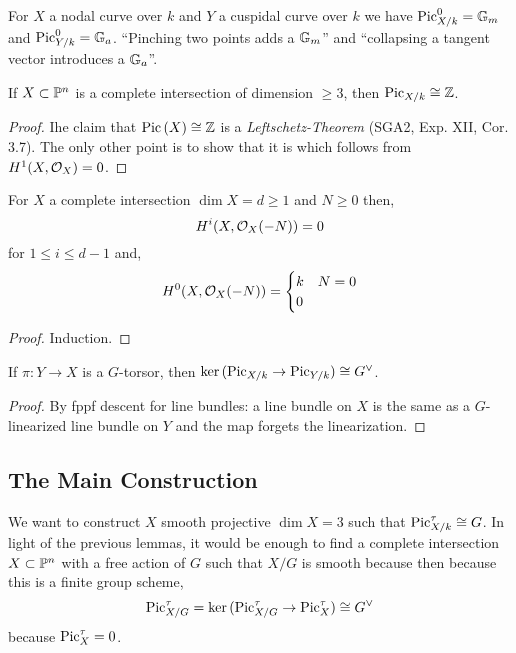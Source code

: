 \documentclass[12pt]{article}
\begin{document}
\begin{example}
For $X$ a nodal curve over $k$ and $Y$ a cuspidal curve over $k$ we have $\mathrm{Pic}^0_{X/k} = \Gm$ and $\mathrm{Pic}^0_{Y/k} = \Ga$. ``Pinching two points adds a $\Gm$'' and ``collapsing a tangent vector introduces a $\Ga$''. 
\end{example}

\begin{lemma}
If $X \subset \P^n$ is a complete intersection of dimension $\ge 3$, then $\fPic_{X/k} \cong \Z$. 
\end{lemma}

\begin{proof}
Ihe claim that $\Pic{X} \cong \Z$ is a \textit{Leftschetz-Theorem} (SGA2, Exp. XII, Cor. 3.7). The only other point is to show that it is \etale which follows from $H^1(X, \struct{X}) = 0$. 
\end{proof}

\begin{prop}
For $X$ a complete intersection $\dim{X} = d \ge 1$ and $N \ge 0$ then,
\[ H^i(X, \struct{X}(-N)) = 0 \]
for $1 \le i \le d - 1$ and,
\[ H^0(X, \struct{X}(-N)) = 
\begin{cases}
k & N = 0 
\\
0
\end{cases} \]
\end{prop}

\begin{proof}
Induction.
\end{proof}

\begin{lemma}
If $\pi : Y \to X$ is a $G$-torsor, then $\ker{(\fPic_{X/k} \to \fPic_{Y/k})} \cong G^\vee$.
\end{lemma}

\begin{proof}
By fppf descent for line bundles: a line bundle on $X$ is the same as a $G$-linearized line bundle on $Y$ and the map forgets the linearization. 
\end{proof}

\subsection{The Main Construction}

We want to construct $X$ smooth projective $\dim{X} = 3$ such that $\fPic^\tau_{X/k} \cong G$. In light of the previous lemmas, it would be enough to find a complete intersection $X \subset \P^n$ with a free action of $G$ such that $X / G$ is smooth because then because this is a finite group scheme,
\[ \fPic^\tau_{X/G} = \ker{(\fPic^\tau_{X/G} \to \fPic^\tau_{X})} \cong G^\vee \]
because $\fPic^\tau_X = 0$. 
\end{document}
